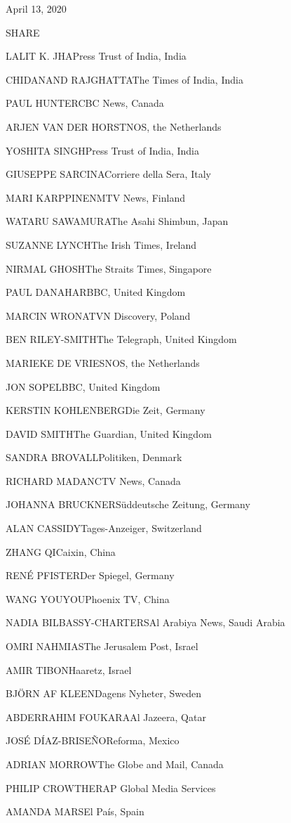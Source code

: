 April 13, 2020

SHARE

LALIT K. JHAPress Trust of India, India

CHIDANAND RAJGHATTAThe Times of India, India

PAUL HUNTERCBC News, Canada

ARJEN VAN DER HORSTNOS, the Netherlands

YOSHITA SINGHPress Trust of India, India

GIUSEPPE SARCINACorriere della Sera, Italy

MARI KARPPINENMTV News, Finland

WATARU SAWAMURAThe Asahi Shimbun, Japan

SUZANNE LYNCHThe Irish Times, Ireland

NIRMAL GHOSHThe Straits Times, Singapore

PAUL DANAHARBBC, United Kingdom

MARCIN WRONATVN Discovery, Poland

BEN RILEY-SMITHThe Telegraph, United Kingdom

MARIEKE DE VRIESNOS, the Netherlands

JON SOPELBBC, United Kingdom

KERSTIN KOHLENBERGDie Zeit, Germany

DAVID SMITHThe Guardian, United Kingdom

SANDRA BROVALLPolitiken, Denmark

RICHARD MADANCTV News, Canada

JOHANNA BRUCKNERSüddeutsche Zeitung, Germany

ALAN CASSIDYTages-Anzeiger, Switzerland

ZHANG QICaixin, China

RENÉ PFISTERDer Spiegel, Germany

WANG YOUYOUPhoenix TV, China

NADIA BILBASSY-CHARTERSAl Arabiya News, Saudi Arabia

OMRI NAHMIASThe Jerusalem Post, Israel

AMIR TIBONHaaretz, Israel

BJÖRN AF KLEENDagens Nyheter, Sweden

ABDERRAHIM FOUKARAAl Jazeera, Qatar

JOSÉ DÍAZ-BRISEÑOReforma, Mexico

ADRIAN MORROWThe Globe and Mail, Canada

PHILIP CROWTHERAP Global Media Services

AMANDA MARSEl País, Spain

